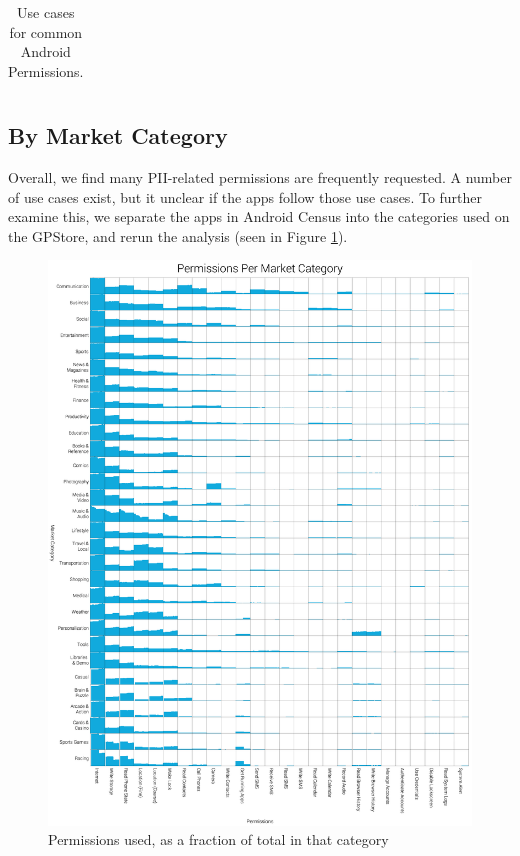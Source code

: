 \begin{table}[h]
\begin{small}
\begin{tabular}{p{3cm}|p{12.5cm}}
\end{tabular}
\end{small}
\caption{Use cases for common Android Permissions.}
\label{tab:permissionsanduses}
\end{table}

\subsection{By Market Category}
\label{sec:marketcategory}
Overall, we find many PII-related permissions are frequently requested. A number of use cases exist, but it unclear if the apps follow those use cases. To further examine this, we separate the apps in Android Census into the categories used on the GPStore, and rerun the analysis (seen in Figure \ref{fig:permissionspercategory}).

\begin{figure}[h]
\begin{center}
\includegraphics[width=1.0\columnwidth]{figs/PermissionsforMarketCategory}
\caption{Permissions used, as a fraction of total in that category}
\label{fig:permissionspercategory}
\end{center}
\end{figure}


